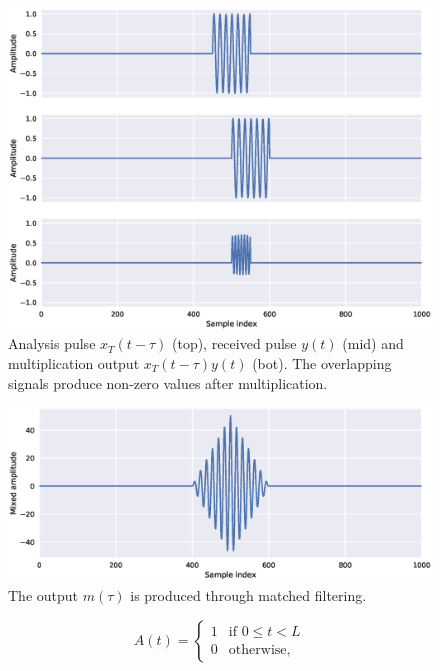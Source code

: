 \begin{figure}[t]
	\centering
	\includegraphics[scale=0.5]{figs_temp/mixing1}
	\caption{Analysis pulse $x_T(t-\tau)$ (top), received pulse $y(t)$ (mid) and multiplication output $x_T(t-\tau)y(t)$ (bot). The overlapping signals produce non-zero values after multiplication.}
	\label{fig:mix1}
\end{figure}

\begin{figure}[t]
	\centering
	\includegraphics[scale=0.5]{figs_temp/mixing2}
	\caption{The output $m(\tau)$ is produced through matched filtering.}
	\label{fig:mix2}
\end{figure}
\begin{equation}
	A(t) = \begin{cases}
		1 & \text{if $0\leq t < L$} \\
		0 & \text{otherwise},
	\end{cases}
\end{equation}

